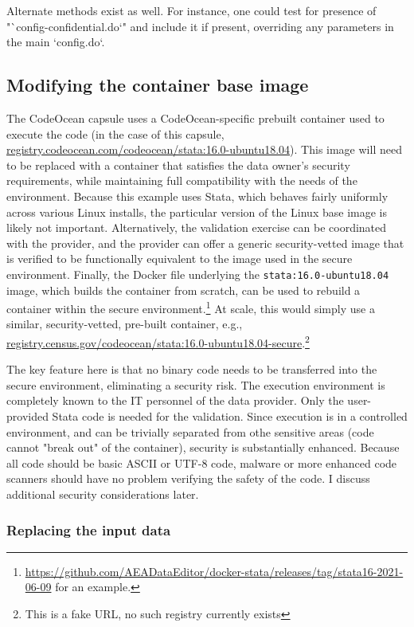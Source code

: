 \documentclass[]{hdsr}
\begin{document}
Alternate methods exist as well. For instance, one could test for presence of "`config-confidential.do`" and include it if present, overriding any parameters in the main `config.do`.

\subsection{Modifying the container base image}

The CodeOcean capsule uses a CodeOcean-specific prebuilt container used to execute the code (in the case of this capsule, \url{registry.codeocean.com/codeocean/stata:16.0-ubuntu18.04}). This image will need to be replaced with a container that satisfies the data owner's security requirements, while maintaining full compatibility with the needs of the environment. Because this example uses Stata, which behaves fairly uniformly across various Linux installs, the particular version of the Linux base image is likely not important.   Alternatively, the validation exercise can be coordinated with the provider, and the provider can offer a generic security-vetted image that is verified to be functionally equivalent to the image used in the secure environment. Finally, the Docker file underlying the \texttt{stata:16.0-ubuntu18.04} image, which builds the container from scratch, can be used to rebuild a container within the secure environment.\footnote{\href{github.com/AEADataEditor/docker-stata/releases/tag/stata16-2021-06-09}{https://github.com/AEADataEditor/docker-stata/releases/tag/stata16-2021-06-09} for an example.} At scale, this would simply use a similar, security-vetted, pre-built container, e.g., \url{registry.census.gov/codeocean/stata:16.0-ubuntu18.04-secure}.\footnote{This is a fake URL, no such registry currently exists}

The key feature here is that no binary code needs to be transferred into the secure environment, eliminating a security risk. The execution environment is completely known to the IT personnel of the data provider. Only the user-provided Stata code is needed for the validation. Since execution is in a controlled environment, and can be trivially separated from othe sensitive areas (code cannot "break out" of the container), security is substantially enhanced. Because all code should be basic ASCII or UTF-8 code, malware or more enhanced code scanners should have no problem verifying the safety of the code. I discuss additional security considerations later.

\subsubsection{Replacing the input data}
\end{document}

